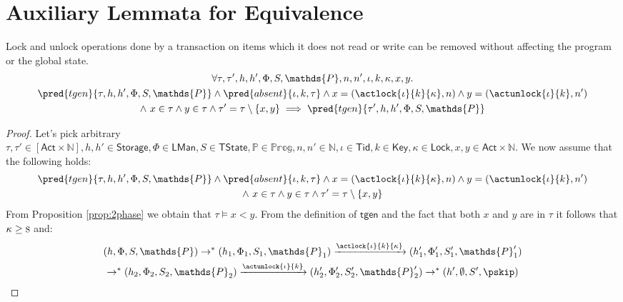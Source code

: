 \chapter{Auxiliary Lemmata for Equivalence}

\begin{lem}
	\label{lem:lockAbsent}
	Lock and unlock operations done by a transaction on items which it does not read or write can be removed without affecting the program or the global state.
	\begin{gather*}
		\forall \tau, \tau', h, h', \Phi, S, \mathds{P}, n, n', \iota, k, \kappa, x, y \ldotp
			\\
		\pred{tgen}{\tau, h, h', \Phi, S, \mathds{P}} \land  \pred{absent}{\iota, k, \tau} \land x = (\actlock{\iota}{k}{\kappa}, n) \land y = (\actunlock{\iota}{k}, n') \\ \land\ x \in \tau \land y \in \tau
		\land \tau' = \tau \setminus \{ x, y \}
			\implies
		\pred{tgen}{\tau', h, h', \Phi, S, \mathds{P}}
	\end{gather*}
	\begin{proof}
	Let's pick arbitrary $\tau, \tau' \in [\mathsf{Act} \times \mathds{N}], h, h' \in \mathsf{Storage}, \Phi \in \mathsf{LMan}, S \in \mathsf{TState}, \mathds{P} \in \mathds{Prog}, n, n' \in \mathds{N}, \iota \in \mathsf{Tid}, k \in \mathsf{Key}, \kappa \in \mathsf{Lock}, x, y \in \mathsf{Act} \times \mathds{N}$. We now assume that the following holds:
	\begin{gather*}
		\pred{tgen}{\tau, h, h', \Phi, S, \mathds{P}} \land  \pred{absent}{\iota, k, \tau} \land x = (\actlock{\iota}{k}{\kappa}, n) \land y = (\actunlock{\iota}{k}, n') \\ \land\ x \in \tau \land y \in \tau
		\land \tau' = \tau \setminus \{ x, y \}
	\end{gather*}
	From Proposition \ref{prop:2phase} we obtain that $\tau \vDash x < y$. From the definition of $\mathsf{tgen}$ and the fact that both $x$ and $y$ are in $\tau$ it follows that $\kappa \geq \textsc{s}$ and:
	\begin{gather}
		(h, \Phi, S, \mathds{P}) \rightarrow^* (h_1, \Phi_1, S_1, \mathds{P}_1) \xrightarrow{\actlock{\iota}{k}{\kappa}} (h_1', \Phi_1', S_1', \mathds{P}_1') \\ \rightarrow^* (h_2, \Phi_2, S_2, \mathds{P}_2) \xrightarrow{\actunlock{\iota}{k}} (h_2', \Phi_2', S_2', \mathds{P}_2') \rightarrow^* (h', \emptyset, S', \pskip)
	\end{gather}

\end{proof}
\end{lem}
